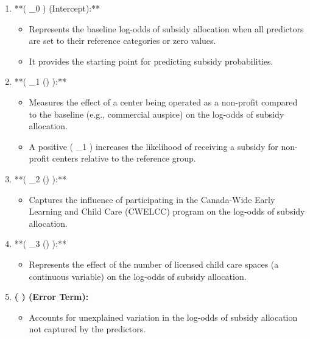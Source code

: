 \documentclass[
  letterpaper,
  DIV=11,
  numbers=noendperiod]{scrartcl}
\providecommand{\tightlist}{%
  \setlength{\itemsep}{0pt}\setlength{\parskip}{0pt}}\usepackage{longtable,booktabs,array}
\begin{document}
\begin{enumerate}
\def\labelenumi{\arabic{enumi}.}
\tightlist
\item
  **( \beta\_0 ) (Intercept):**

  \begin{itemize}
  \tightlist
  \item
    Represents the baseline log-odds of subsidy allocation when all
    predictors are set to their reference categories or zero values.
  \item
    It provides the starting point for predicting subsidy probabilities.
  \end{itemize}
\item
  **( \beta\_1 () ):**

  \begin{itemize}
  \tightlist
  \item
    Measures the effect of a center being operated as a non-profit
    compared to the baseline (e.g., commercial auspice) on the log-odds
    of subsidy allocation.
  \item
    A positive ( \beta\_1 ) increases the likelihood of receiving a
    subsidy for non-profit centers relative to the reference group.
  \end{itemize}
\item
  **( \beta\_2 () ):**

  \begin{itemize}
  \tightlist
  \item
    Captures the influence of participating in the Canada-Wide Early
    Learning and Child Care (CWELCC) program on the log-odds of subsidy
    allocation.
  \end{itemize}
\item
  **( \beta\_3 () ):**

  \begin{itemize}
  \tightlist
  \item
    Represents the effect of the number of licensed child care spaces (a
    continuous variable) on the log-odds of subsidy allocation.
  \end{itemize}
\item
  \textbf{( \epsilon ) (Error Term):}

  \begin{itemize}
  \tightlist
  \item
    Accounts for unexplained variation in the log-odds of subsidy
    allocation not captured by the predictors.
  \end{itemize}
\end{enumerate}
\end{document}
